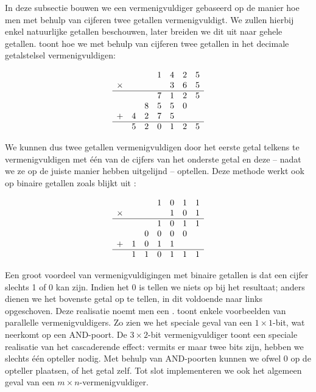 In deze subsectie bouwen we een vermenigvuldiger gebaseerd op de manier hoe men met behulp van cijferen twee getallen vermenigvuldigt. We zullen hierbij enkel natuurlijke getallen beschouwen, later breiden we dit uit naar gehele getallen.  toont hoe we met behulp van cijferen twee getallen in het decimale getalstelsel vermenigvuldigen:

\begin{equation}
\begin{array}{lcccccc}
&&&1&4&2&5\\
\times&&&&3&6&5\\\hline
&&&7&1&2&5\\
&&8&5&5&0&\\
+&4&2&7&5&&\\\hline
&5&2&0&1&2&5
\end{array}
\eqnlab{multiplyNormal}
\end{equation}

We kunnen dus twee getallen vermenigvuldigen door het eerste getal telkens te vermenigvuldigen met \'e\'en van de cijfers van het onderste getal en deze -- nadat we ze op de juiste manier hebben uitgelijnd  -- optellen. Deze methode werkt ook op binaire getallen zoals blijkt uit :

\begin{equation}
\begin{array}{lcccccc}
&&&1&0&1&1\\
\times&&&&1&0&1\\\hline
&&&1&0&1&1\\
&&0&0&0&0&\\
+&1&0&1&1&&\\\hline
&1&1&0&1&1&1
\end{array}
\eqnlab{multiplyBinary}
\end{equation}

Een groot voordeel van vermenigvuldigingen met binaire getallen is dat een cijfer slechts 1 of 0 kan zijn. Indien het 0 is tellen we niets op bij het resultaat; anders dienen we het bovenste getal op te tellen, in dit voldoende naar links opgeschoven. Deze realisatie noemt men een .  toont enkele voorbeelden van parallelle vermenigvuldigers. Zo zien we het speciale geval van een $1\times 1$-bit, wat neerkomt op een AND-poort. De $3\times 2$-bit vermenigvuldiger toont een speciale realisatie van het cascaderende effect: vermits er maar twee bits zijn, hebben we slechts \'e\'en opteller nodig. Met behulp van AND-poorten kunnen we ofwel $0$ op de opteller plaatsen, of het getal zelf. Tot slot implementeren we ook het algemeen geval van een $m\times n$-vermenigvuldiger.

